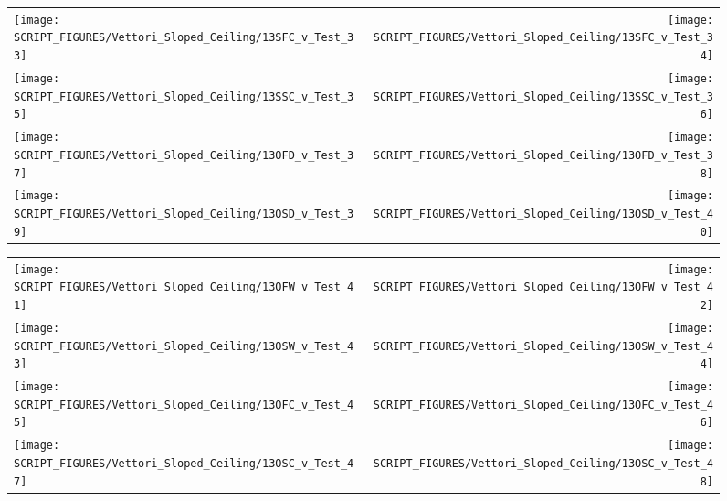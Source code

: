 \begin{figure}[!ht]
\begin{tabular*}{\textwidth}{l@{\extracolsep{\fill}}r}
\texttt{[image: SCRIPT\_FIGURES/Vettori\_Sloped\_Ceiling/13SFC\_v\_Test\_33]} &
\texttt{[image: SCRIPT\_FIGURES/Vettori\_Sloped\_Ceiling/13SFC\_v\_Test\_34]} \\
\texttt{[image: SCRIPT\_FIGURES/Vettori\_Sloped\_Ceiling/13SSC\_v\_Test\_35]} &
\texttt{[image: SCRIPT\_FIGURES/Vettori\_Sloped\_Ceiling/13SSC\_v\_Test\_36]} \\
\texttt{[image: SCRIPT\_FIGURES/Vettori\_Sloped\_Ceiling/13OFD\_v\_Test\_37]} &
\texttt{[image: SCRIPT\_FIGURES/Vettori\_Sloped\_Ceiling/13OFD\_v\_Test\_38]} \\
\texttt{[image: SCRIPT\_FIGURES/Vettori\_Sloped\_Ceiling/13OSD\_v\_Test\_39]} &
\texttt{[image: SCRIPT\_FIGURES/Vettori\_Sloped\_Ceiling/13OSD\_v\_Test\_40]} \\
\end{tabular*}
\label{Vettori_Sloped_5}
\end{figure}

\clearpage

\begin{figure}[!ht]
\begin{tabular*}{\textwidth}{l@{\extracolsep{\fill}}r}
\texttt{[image: SCRIPT\_FIGURES/Vettori\_Sloped\_Ceiling/13OFW\_v\_Test\_41]} &
\texttt{[image: SCRIPT\_FIGURES/Vettori\_Sloped\_Ceiling/13OFW\_v\_Test\_42]} \\
\texttt{[image: SCRIPT\_FIGURES/Vettori\_Sloped\_Ceiling/13OSW\_v\_Test\_43]} &
\texttt{[image: SCRIPT\_FIGURES/Vettori\_Sloped\_Ceiling/13OSW\_v\_Test\_44]} \\
\texttt{[image: SCRIPT\_FIGURES/Vettori\_Sloped\_Ceiling/13OFC\_v\_Test\_45]} &
\texttt{[image: SCRIPT\_FIGURES/Vettori\_Sloped\_Ceiling/13OFC\_v\_Test\_46]} \\
\texttt{[image: SCRIPT\_FIGURES/Vettori\_Sloped\_Ceiling/13OSC\_v\_Test\_47]} &
\texttt{[image: SCRIPT\_FIGURES/Vettori\_Sloped\_Ceiling/13OSC\_v\_Test\_48]} \\
\end{tabular*}
\label{Vettori_Sloped_6}
\end{figure}

